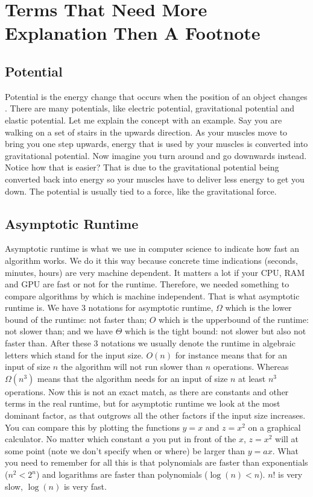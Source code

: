 \appendix
\appendixpage
\section{Terms That Need More Explanation Then A Footnote}
\subsection{Potential} \label{sec:potential}
Potential is the energy change that occurs when the position of an object changes \cite{potential}. There are many potentials, like electric potential, gravitational potential and elastic 
potential. Let me explain the concept with an example. Say you are walking on a set of stairs in the upwards direction. As your muscles move to bring you one step upwards, energy that is used
by your muscles is converted into gravitational potential. Now imagine you turn around and go downwards instead. Notice how that is easier? That is due to the gravitational potential being 
converted back into energy so your muscles have to deliver less energy to get you down. The potential is usually tied to a force, like the gravitational force.

\subsection{Asymptotic Runtime} \label{sec:runtime}
Asymptotic runtime is what we use in computer science to indicate how fast an algorithm works. We do it this way because concrete time indications (seconds, minutes, hours) are very machine 
dependent. It matters a lot if your CPU, RAM and GPU are fast or not for the runtime. Therefore, we needed something to compare algorithms by which is machine independent. That is what asymptotic
runtime is. We have 3 notations for asymptotic runtime, $\Omega$ which is the lower bound of the runtime: not faster than; $O$ which is the upperbound of the runtime: not slower than; and we 
have $\Theta$ which is the tight bound: not slower but also not faster than. After these 3 notations we usually denote the runtime in algebraic letters which stand for the input size. $O(n)$ for 
instance means that for an input of size $n$ the algorithm will not run slower than $n$ operations. Whereas $\Omega(n^3)$ means that the algorithm needs for an input of size $n$ at least $n^3$ 
operations. Now this is not an exact match, as there are constants and other terms in the real runtime, but for asymptotic runtime we look at the most dominant factor, as that outgrows all the 
other factors if the input size increases. You can compare this by plotting the functions $y = x$ and $z = x^2$ on a graphical calculator. No matter which constant $a$ you put in front of the $x$,
$z = x^2$ will at some point (note we don't specify when or where) be larger than $y = ax$. What you need to remember for all this is that polynomials are faster than exponentials ($n^2 < 2^n$)
and logarithms are faster than polynomials ($\log(n) < n$). $n!$ is very slow, $\log(n)$ is very fast.

